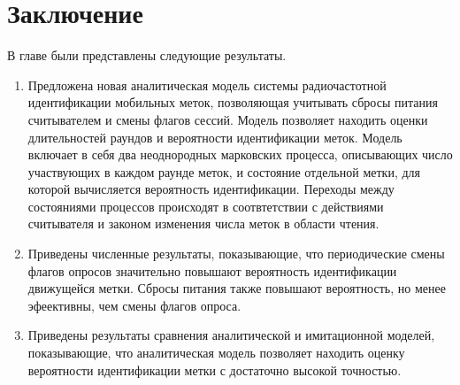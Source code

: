 \section{Заключение}\label{sec:ch3_conclusion}
В главе были представлены следующие результаты.

\begin{enumerate}
\item Предложена новая аналитическая модель системы радиочастотной идентификации мобильных меток, позволяющая учитывать сбросы питания считывателем и смены флагов сессий. Модель позволяет находить оценки длительностей раундов и вероятности идентификации меток. Модель включает в себя два неоднородных марковских процесса, описывающих число участвующих в каждом раунде меток, и состояние отдельной метки, для которой вычисляется вероятность идентификации. Переходы между состояниями процессов происходят в соотвтетствии с действиями считывателя и законом изменения числа меток в области чтения.
\item Приведены численные результаты, показывающие, что периодические смены флагов опросов значительно повышают вероятность идентификации движущейся метки. Сбросы питания также повышают вероятность, но менее эфеективны, чем смены флагов опроса.
\item Приведены результаты сравнения аналитической и имитационной моделей, показывающие, что аналитическая модель позволяет находить оценку вероятности идентификации метки с достаточно высокой точностью.
\end{enumerate}

\clearpage

